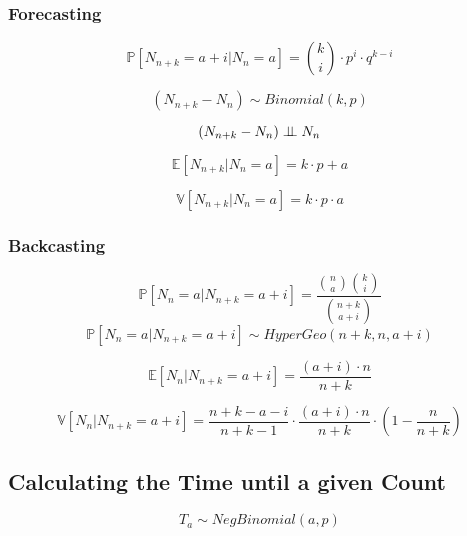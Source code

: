 \subsubsection{Forecasting}
\begin{equation}
    \mathbb{P}[N_{n+k} = a + i | N_n = a] = 
    \binom{k}{i} \cdot p^i \cdot q^{k-i}
\end{equation}

\begin{equation}
    (N_{n+k} - N_n) \sim Binomial(k, p)
\end{equation}

\begin{equation}
    (N_{n+k} - N_n) \perp \!\!\! \perp N_n
\end{equation}

\begin{equation}
    \mathbb{E}[N_{n+k} | N_n = a] = k \cdot p + a
\end{equation}

\begin{equation}
    \mathbb{V}[N_{n+k} | N_n = a] = k \cdot p \cdot a
\end{equation}

\subsubsection{Backcasting}
\begin{equation}
    \mathbb{P}[N_n = a | N_{n+k} = a + i] = 
    \frac{
        \binom{n}{a} \binom{k}{i}
        }{
        \binom{n+k}{a+i}
    }
\end{equation}
\begin{equation}
    \mathbb{P}[N_n = a | N_{n+k} = a + i] \sim HyperGeo(n+k, n, a+i)
\end{equation}

\begin{equation}
    \mathbb{E}[N_n | N_{n+k} = a + i] = \frac{(a + i) \cdot n}{n + k}
\end{equation}

\begin{equation}
    \mathbb{V}[N_n | N_{n+k} = a + i] = 
    \frac{n + k - a - i}{n + k - 1} \cdot 
    \frac{(a + i) \cdot n}{ n + k} \cdot 
    ( 1 - \frac{n}{n + k})
\end{equation}

\subsection{Calculating the Time until a given Count}
\begin{equation}
    T_a \sim NegBinomial(a, p) 
\end{equation}

